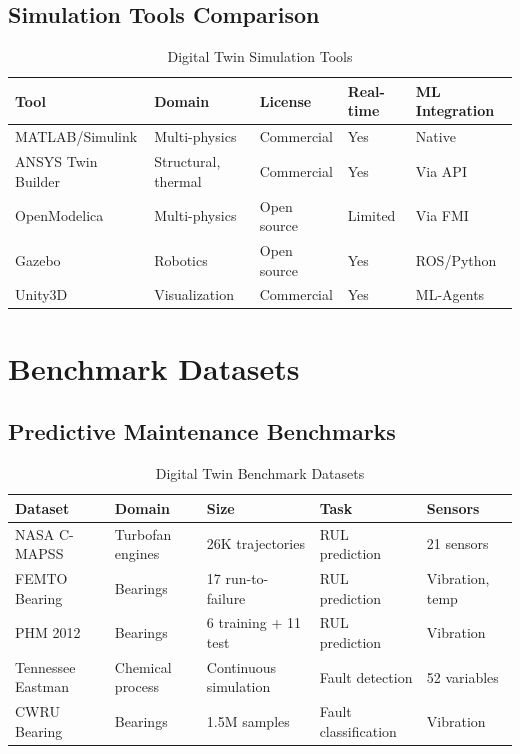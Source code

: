\documentclass[12pt,a4paper]{article}
\begin{document}
\subsection{Simulation Tools Comparison}

\begin{table}[H]
\centering
\caption{Digital Twin Simulation Tools}
\begin{tabular}{lllll}
\toprule
\textbf{Tool} & \textbf{Domain} & \textbf{License} & \textbf{Real-time} & \textbf{ML Integration} \\
\midrule
MATLAB/Simulink & Multi-physics & Commercial & Yes & Native \\
ANSYS Twin Builder & Structural, thermal & Commercial & Yes & Via API \\
OpenModelica & Multi-physics & Open source & Limited & Via FMI \\
Gazebo & Robotics & Open source & Yes & ROS/Python \\
Unity3D & Visualization & Commercial & Yes & ML-Agents \\
\bottomrule
\end{tabular}
\end{table}

\section{Benchmark Datasets}

\subsection{Predictive Maintenance Benchmarks}

\begin{table}[H]
\centering
\caption{Digital Twin Benchmark Datasets}
\begin{tabular}{lllll}
\toprule
\textbf{Dataset} & \textbf{Domain} & \textbf{Size} & \textbf{Task} & \textbf{Sensors} \\
\midrule
NASA C-MAPSS & Turbofan engines & 26K trajectories & RUL prediction & 21 sensors \\
FEMTO Bearing & Bearings & 17 run-to-failure & RUL prediction & Vibration, temp \\
PHM 2012 & Bearings & 6 training + 11 test & RUL prediction & Vibration \\
Tennessee Eastman & Chemical process & Continuous simulation & Fault detection & 52 variables \\
CWRU Bearing & Bearings & 1.5M samples & Fault classification & Vibration \\
\bottomrule
\end{tabular}
\end{table}
\end{document}
